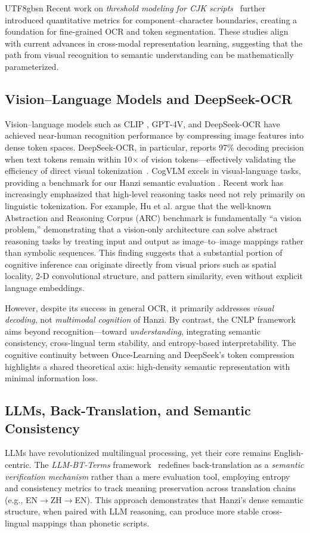 \documentclass[conference]{IEEEtran}
\begin{document}
\begin{CJK*}{UTF8}{gbsn}
Recent work on \textit{threshold modeling for CJK scripts}~\citep{weigang2025threshold} further introduced quantitative metrics for component–character boundaries, creating a foundation for fine-grained OCR and token segmentation. These studies align with current advances in cross-modal representation learning, suggesting that the path from visual recognition to semantic understanding can be mathematically parameterized.

\subsection{Vision–Language Models and DeepSeek-OCR}
Vision–language models such as CLIP \cite{radford2021learning}, GPT-4V, and DeepSeek-OCR have achieved near-human recognition performance by compressing image features into dense token spaces. DeepSeek-OCR, in particular, reports 97\% decoding precision when text tokens remain within 10$\times$ of vision tokens---effectively validating the efficiency of direct visual tokenization~\citep{wei2025deepseek}. CogVLM excels in visual-language tasks, providing a benchmark for our Hanzi semantic evaluation \cite{wang2024cogvlm}. 
Recent work has increasingly emphasized that high-level reasoning tasks need not rely primarily on linguistic tokenization. For example, Hu et al. \cite{hu2025arc} argue that the well-known Abstraction and Reasoning Corpus (ARC) benchmark is fundamentally “a vision problem,” demonstrating that a vision-only architecture can solve abstract reasoning tasks by treating input and output as image–to–image mappings rather than symbolic sequences. This finding suggests that a substantial portion of cognitive inference can originate directly from visual priors such as spatial locality, 2-D convolutional structure, and pattern similarity, even without explicit language embeddings.

However, despite its success in general OCR, it primarily addresses \textit{visual decoding}, not \textit{multimodal cognition} of Hanzi.  By contrast, the CNLP framework aims beyond recognition---toward \textit{understanding}, integrating semantic consistency, cross-lingual term stability, and entropy-based interpretability. The cognitive continuity between Once-Learning and DeepSeek’s token compression highlights a shared theoretical axis: high-density semantic representation with minimal information loss.

\subsection{LLMs, Back-Translation, and Semantic Consistency}
LLMs have revolutionized multilingual processing, yet their core remains English-centric. The \textit{LLM-BT-Terms} framework~\citep{weigang2025paradox,weigang2025llm} redefines back-translation as a \textit{semantic verification mechanism} rather than a mere evaluation tool, employing entropy and consistency metrics to track meaning preservation across translation chains (e.g., EN$\rightarrow$ZH$\rightarrow$EN). This approach demonstrates that Hanzi’s dense semantic structure, when paired with LLM reasoning, can produce more stable cross-lingual mappings than phonetic scripts.


\end{CJK*}
\end{document}
